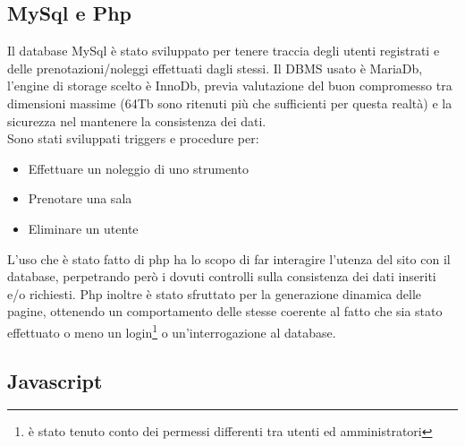 
\subsection{MySql e Php}
Il database MySql è stato sviluppato per tenere traccia degli utenti registrati e delle prenotazioni/noleggi effettuati dagli stessi. Il DBMS usato è MariaDb, l'engine di storage scelto è InnoDb, previa valutazione del buon compromesso tra dimensioni massime (64Tb sono ritenuti più che sufficienti per questa realtà) e la sicurezza nel mantenere la consistenza dei dati.\\
Sono stati sviluppati triggers e procedure per:
\begin{itemize}
\item Effettuare un noleggio di uno strumento
\item Prenotare una sala
\item Eliminare un utente
\end{itemize}
L'uso che è stato fatto di php ha lo scopo di far interagire l'utenza del sito con il database, perpetrando però i dovuti controlli sulla consistenza dei dati inseriti e/o richiesti. Php inoltre è stato sfruttato per la generazione dinamica delle pagine, ottenendo un comportamento delle stesse coerente al fatto che sia stato effettuato o meno un login\footnote{è stato tenuto conto dei permessi differenti tra utenti ed amministratori} o un'interrogazione al database.

\pagebreak

\subsection{Javascript}
